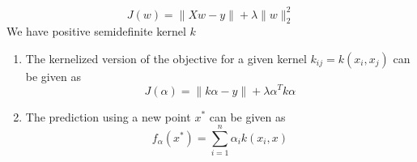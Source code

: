 $$J(w) = \| Xw - y \| + \lambda\|w\|_{2}^{2}$$
We have positive semidefinite kernel $k$

\begin{enumerate}
                        
    \item 
         The kernelized version of the objective for a given kernel $k_{ij} = k(x_{i}, x_{j})$ can be given as $$J(\alpha) = \| k\alpha - y \| + \lambda\alpha^{T}k\alpha$$
    
    \item
        The prediction using a new point $x^{*}$ can be given as $$f_{\alpha}(x^{*}) = \sum_{i=1}^{n} \alpha_{i}k(x_{i}, x)$$
    
\end{enumerate}